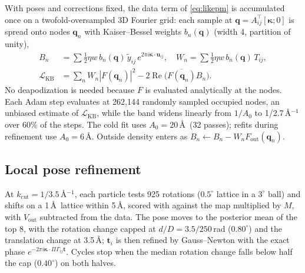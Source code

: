 With poses and corrections fixed, the data term of \cref{eq:likepm} is accumulated once on a twofold-oversampled 3D Fourier grid: each sample at $\mathbf{q}=A_{ij}^{\top}[\bm{\kappa};0]$ is spread onto nodes $\mathbf{q}_n$ with Kaiser--Bessel weights $b_n(\mathbf{q})$ (width 4, partition of unity),
\begin{equation}
\begin{aligned}
B_n&=\textstyle\sum\tfrac12\eta w\,b_n(\mathbf{q})\,\tilde{y}_{ij}\,e^{2\pi i\bm{\kappa}\cdot\mathbf{u}_{ij}},\quad
W_n=\textstyle\sum\tfrac12\eta w\,b_n(\mathbf{q})\,T_{ij},\\
\mathcal{L}_{\mathrm{KB}}&=\textstyle\sum_n W_n|F(\mathbf{q}_n)|^2-2\operatorname{Re}\big(\overline{F(\mathbf{q}_n)}B_n\big).
\end{aligned}
\label{eq:kb}
\end{equation}
No deapodization is needed because $F$ is evaluated analytically at the nodes.
Each Adam step evaluates  at 262,144 randomly sampled occupied nodes, an unbiased estimate of $\mathcal{L}_{\mathrm{KB}}$, while the band widens linearly from $1/A_0$ to 1/2.7\,\AA$^{-1}$ over 60\% of the steps.
The cold fit uses $A_0=20$\,\AA\ (32 passes); refits during refinement use $A_0=6$\,\AA.
Outside density enters as $B_n\leftarrow B_n-W_nF_{\mathrm{out}}(\mathbf{q}_n)$.

\subsection{Local pose refinement}
\label{sec:suppl:method:p2}

At $k_{\mathrm{cut}}=1/3.5$\,\AA$^{-1}$, each particle tests 925 rotations ($0.5^\circ$ lattice in a $3^\circ$ ball) and shifts on a 1\,\AA\ lattice within 5\,\AA, scored with  against the map multiplied by $M$, with $V_{\mathrm{out}}$ subtracted from the data.
The pose moves to the posterior mean of the top 8, with the rotation change capped at $d/D=3.5/250$\,rad ($0.80^\circ$) and the translation change at 3.5\,\AA; $\mathbf{t}_i$ is then refined by Gauss--Newton with the exact phase $e^{-2\pi i\bm{\kappa}\cdot\Pi\Gamma_{ij}\mathbf{t}}$.
Cycles stop when the median rotation change falls below half the cap ($0.40^\circ$) on both halves.

